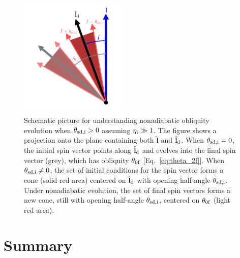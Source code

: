 \documentclass[twocolumn,twocolappendix]{aastex63}
\newcommand*{\bsmb}[1]{\boldsymbol{\mathbf{#1}}}
\newcommand*{\uv}[1]{\hat{\bsmb{#1}}}
\begin{document}
\begin{figure}
    \centering
    \includegraphics[width=0.47\textwidth]{plots_diskdisp/2_nonad_rot_cropped.png}
    \caption{Schematic picture for understanding nonadiabatic obliquity
    evolution when $\theta_{\rm sd, i} > 0$ assuming $\eta_{\rm i} \gg 1$. The
    figure shows a projection onto the plane containing both $\uv{l}$ and
    $\uv{l}_{\rm d}$. When $\theta_{\rm sd, i} = 0$, the initial spin vector
    points along $\uv{l}_{\rm d}$ and evolves into the final spin vector (grey),
    which has obliquity $\theta_{\rm 0f}$ [Eq.~\eqref{eq:theta_2f}]. When
    $\theta_{\rm sd, i} \neq 0$, the set of initial conditions for the spin
    vector forms a cone (solid red area) centered on $\uv{l}_{\rm d}$ with
    opening half-angle $\theta_{\rm sd, i}$. Under nonadiabatic evolution, the
    set of final spin vectors forms a new cone, still with opening half-angle
    $\theta_{\rm sd, i}$, centered on $\theta_{\rm 0f}$ (light red
    area).}\label{fig:2nonadrot}
\end{figure}

\section{Summary}\label{s:disk}
\end{document}
